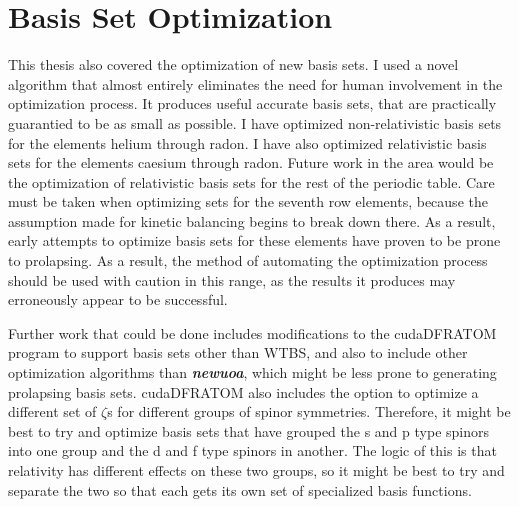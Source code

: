 \section{Basis Set Optimization}
This thesis also covered the optimization of new basis sets. I used a novel algorithm that almost entirely eliminates the need for human involvement in the optimization process. It produces useful accurate basis sets, that are practically guarantied to be as small as possible. I have optimized non-relativistic basis sets for the elements helium through radon. I have also optimized relativistic basis sets for the elements caesium through radon. Future work in the area would be the optimization of relativistic basis sets for the rest of the periodic table. Care must be taken when optimizing sets for the seventh row elements, because the assumption made for kinetic balancing begins to break down there. As a result, early attempts to optimize basis sets for these elements have proven to be prone to prolapsing. As a result, the method of automating the optimization process should be used with caution in this range, as the results it produces may erroneously appear to be successful. 

Further work that could be done includes modifications to the cudaDFRATOM program to support basis sets other than WTBS, and also to include other optimization algorithms than \textit{\textbf{newuoa}}, which might be less prone to generating prolapsing basis sets. cudaDFRATOM also includes the option to optimize a different set of $\zeta$s for different groups of spinor symmetries. Therefore, it might be best to try and optimize basis sets that have grouped the s and p type spinors into one group and the d and f type spinors in another. The logic of this is that relativity has different effects on these two groups, so it might be best to try and separate the two so that each gets its own set of specialized basis functions.